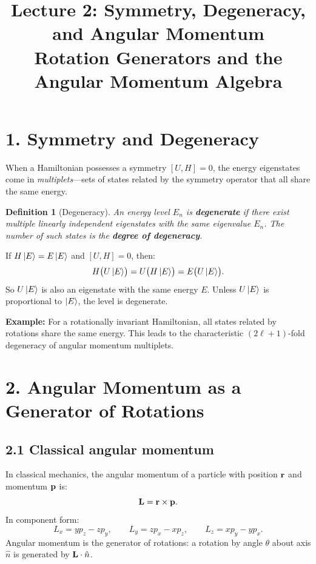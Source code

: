 \documentclass[12pt,a4paper]{article}
\title{\textbf{Lecture 2: Symmetry, Degeneracy, and Angular Momentum} \\ \large Rotation Generators and the Angular Momentum Algebra}
\date{}
\newtheorem{definition}{Definition}
\begin{document}
\maketitle
\thispagestyle{fancy}

\section{1. Symmetry and Degeneracy}

When a Hamiltonian possesses a symmetry $[U, H] = 0$, the energy eigenstates come in \emph{multiplets}---sets of states related by the symmetry operator that all share the same energy.

\begin{definition}[Degeneracy]
An energy level $E_n$ is \textbf{degenerate} if there exist multiple linearly independent eigenstates with the same eigenvalue $E_n$.  The number of such states is the \textbf{degree of degeneracy}.
\end{definition}

\noindent If $H\ket{E} = E\ket{E}$ and $[U, H] = 0$, then:
\[
    H\bigl(U\ket{E}\bigr) = U\bigl(H\ket{E}\bigr) = E\bigl(U\ket{E}\bigr).
\]
So $U\ket{E}$ is also an eigenstate with the same energy $E$.  Unless $U\ket{E}$ is proportional to $\ket{E}$, the level is degenerate.

\medskip
\noindent\textbf{Example:} For a rotationally invariant Hamiltonian, all states related by rotations share the same energy.  This leads to the characteristic $(2\ell+1)$-fold degeneracy of angular momentum multiplets.

\section{2. Angular Momentum as a Generator of Rotations}

\subsection{2.1 Classical angular momentum}

In classical mechanics, the angular momentum of a particle with position $\vb{r}$ and momentum $\vb{p}$ is:
\[
    \vb{L} = \vb{r} \times \vb{p}.
\]
In component form:
\[
    L_x = yp_z - zp_y, \qquad L_y = zp_x - xp_z, \qquad L_z = xp_y - yp_x.
\]
Angular momentum is the generator of rotations: a rotation by angle $\theta$ about axis $\hat{n}$ is generated by $\vb{L}\cdot\hat{n}$.
\end{document}
